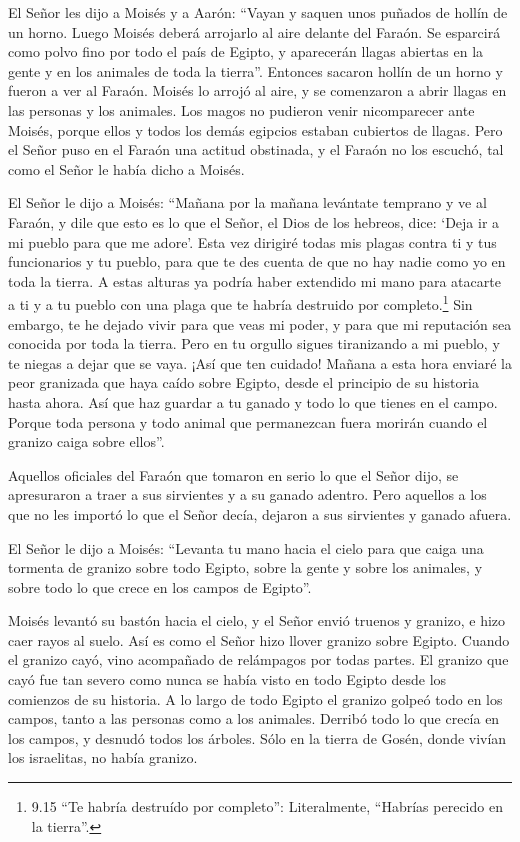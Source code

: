  El Señor les dijo a Moisés y a Aarón: ``Vayan y saquen unos
puñados de hollín de un horno. Luego Moisés deberá arrojarlo al aire
delante del Faraón.  Se esparcirá como polvo fino por todo
el país de Egipto, y aparecerán llagas abiertas en la gente y en los
animales de toda la tierra''.  Entonces sacaron hollín de
un horno y fueron a ver al Faraón. Moisés lo arrojó al aire, y se
comenzaron a abrir llagas en las personas y los animales. 
Los magos no pudieron venir nicomparecer ante Moisés, porque ellos y
todos los demás egipcios estaban cubiertos de llagas.  Pero
el Señor puso en el Faraón una actitud obstinada, y el Faraón no los
escuchó, tal como el Señor le había dicho a Moisés.

 El Señor le dijo a Moisés: ``Mañana por la mañana
levántate temprano y ve al Faraón, y dile que esto es lo que el Señor,
el Dios de los hebreos, dice: `Deja ir a mi pueblo para que me adore'.
 Esta vez dirigiré todas mis plagas contra ti y tus
funcionarios y tu pueblo, para que te des cuenta de que no hay nadie
como yo en toda la tierra.  A estas alturas ya podría haber
extendido mi mano para atacarte a ti y a tu pueblo con una plaga que te
habría destruido por completo.\footnote{9.15 ``Te habría destruído por
  completo'': Literalmente, ``Habrías perecido en la tierra''.}
 Sin embargo, te he dejado vivir para que veas mi poder, y
para que mi reputación sea conocida por toda la tierra. 
Pero en tu orgullo sigues tiranizando a mi pueblo, y te niegas a dejar
que se vaya.  ¡Así que ten cuidado! Mañana a esta hora
enviaré la peor granizada que haya caído sobre Egipto, desde el
principio de su historia hasta ahora.  Así que haz guardar
a tu ganado y todo lo que tienes en el campo. Porque toda persona y todo
animal que permanezcan fuera morirán cuando el granizo caiga sobre
ellos''.

 Aquellos oficiales del Faraón que tomaron en serio lo que
el Señor dijo, se apresuraron a traer a sus sirvientes y a su ganado
adentro.  Pero aquellos a los que no les importó lo que el
Señor decía, dejaron a sus sirvientes y ganado afuera.

 El Señor le dijo a Moisés: ``Levanta tu mano hacia el
cielo para que caiga una tormenta de granizo sobre todo Egipto, sobre la
gente y sobre los animales, y sobre todo lo que crece en los campos de
Egipto''.

 Moisés levantó su bastón hacia el cielo, y el Señor envió
truenos y granizo, e hizo caer rayos al suelo. Así es como el Señor hizo
llover granizo sobre Egipto.  Cuando el granizo cayó, vino
acompañado de relámpagos por todas partes. El granizo que cayó fue tan
severo como nunca se había visto en todo Egipto desde los comienzos de
su historia.  A lo largo de todo Egipto el granizo golpeó
todo en los campos, tanto a las personas como a los animales. Derribó
todo lo que crecía en los campos, y desnudó todos los árboles.
 Sólo en la tierra de Gosén, donde vivían los israelitas,
no había granizo.


